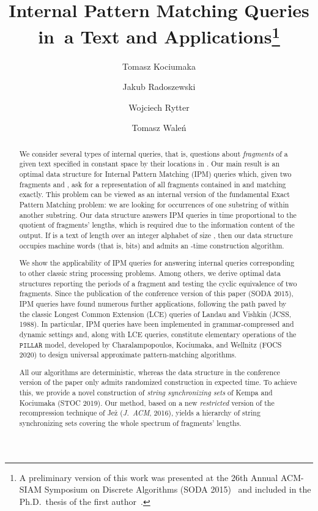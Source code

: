 \documentclass[a4paper]{article}
\title{Internal Pattern Matching Queries in~a Text and Applications\thanks{A preliminary version of this work was presented at the 26th Annual {ACM-SIAM} Symposium on Discrete Algorithms (SODA 2015)~\cite{DBLP:conf/soda/KociumakaRRW15} and included in the Ph.D.\ thesis of the first author~\cite{phd}.}}
\author[1]{Tomasz Kociumaka}
\author[2,3]{Jakub Radoszewski}
\author[2]{Wojciech Rytter}
\author[2]{Tomasz Wale\'n}
\affil[1]{Max Planck Institute for Informatics,  Saarbrücken, Germany}
\affil[ ]{\texttt{tomasz.kociumaka@mpi-inf.mpg.de}}
\affil[2]{University of Warsaw, Warsaw, Poland}
\affil[ ]{\texttt{[jrad, rytter, walen]@mimuw.edu.pl}}
\affil[3]{Samsung R\&D Warsaw, Warsaw, Poland}
\date{\empty}
\theoremstyle{definition}
\theoremstyle{remark}
\newcommand{\pillar}{\ensuremath{\mathtt{PILLAR}}\xspace}
\begin{document}
\maketitle

\begin{abstract}
We consider several types of internal queries, that is, questions about \emph{fragments} of a given text 
specified in constant space by their locations in .
Our main result is an optimal data structure for Internal Pattern Matching (IPM) queries which,
given two fragments  and , ask for a representation of all fragments contained in  and matching  exactly.
This problem can be viewed as an internal version of the fundamental Exact Pattern Matching problem:
we are looking for occurrences of one substring of  within another substring.
Our data structure answers IPM queries in time proportional to the quotient  of fragments' lengths,
which is required due to the information content of the output.
If  is a text of length  over an integer alphabet of size ,
then our data structure occupies  machine words (that is,  bits)
and admits an -time construction algorithm.

We show the applicability of IPM queries for answering internal queries corresponding to other classic string processing problems.
Among others, we derive optimal data structures reporting the periods of a fragment and testing the cyclic equivalence of two fragments.
Since the publication of the conference version of this paper (SODA 2015), IPM queries
have found numerous further applications, following the path paved by the classic Longest Common Extension (LCE) queries of Landau and Vishkin (JCSS, 1988).
In particular, IPM queries have been implemented in grammar-compressed and dynamic settings
and, along with LCE queries, constitute elementary operations of the \pillar model, developed by Charalampopoulos, Kociumaka, and Wellnitz
(FOCS 2020) to design universal approximate pattern-matching algorithms.

All our algorithms are deterministic, whereas the data structure in the conference version of the paper only admits randomized construction in  expected time.
To achieve this, we provide a novel construction of \emph{string synchronizing sets} of Kempa and Kociumaka (STOC 2019).
Our method, based on a new \emph{restricted} version of the recompression technique of Jeż (\emph{J.\ ACM}, 2016),
yields a hierarchy of  string synchronizing sets covering the whole spectrum of fragments' lengths.
\end{abstract}
\end{document}
